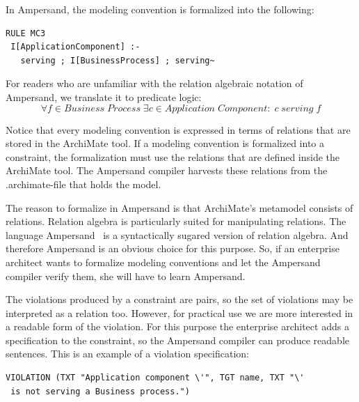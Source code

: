 \documentclass[sn-vancouver]{sn-jnl}%
\theoremstyle{thmstyleone}%
\theoremstyle{thmstyletwo}%
\theoremstyle{thmstylethree}%
\begin{document}
In Ampersand, the modeling convention is formalized into the following:
{\small
\begin{lstlisting}[frame=single, label={rulepolicy3}, caption={}]
RULE MC3
 I[ApplicationComponent] :- 
   serving ; I[BusinessProcess] ; serving~
\end{lstlisting}
}
For readers who are unfamiliar with the relation algebraic notation of Ampersand, we translate it to predicate logic:
\[\forall f \in Business\;Process \;\exists c\in Application\;Component:\; c \;serving \;f\]

Notice that every modeling convention is expressed in terms of relations that are stored in the ArchiMate tool.
If a modeling convention is formalized into a constraint, the formalization must use the relations that are defined inside the ArchiMate tool.
The Ampersand compiler harvests these relations from the .archimate-file that holds the model.

The reason to formalize in Ampersand is that ArchiMate's metamodel consists of relations.
Relation algebra is particularly suited for manipulating relations.
The language Ampersand~\cite{joosten2018relation} is a syntactically sugared version of relation algebra.
And therefore Ampersand is an obvious choice for this purpose.
So, if an enterprise architect wants to formalize modeling conventions and let the Ampersand compiler verify them, she will have to learn Ampersand.

The violations produced by a constraint are pairs,
so the set of violations may be interpreted as a relation too.
However, for practical use we are more interested in a readable form of the violation.
For this purpose the enterprise architect adds a specification to the constraint,
so the Ampersand compiler can produce readable sentences.
This is an example of a violation specification:
{\small
\begin{lstlisting}[frame=single, label={violation}, caption={}]
VIOLATION (TXT "Application component \'", TGT name, TXT "\'
 is not serving a Business process.")
\end{lstlisting}
}
\end{document}
